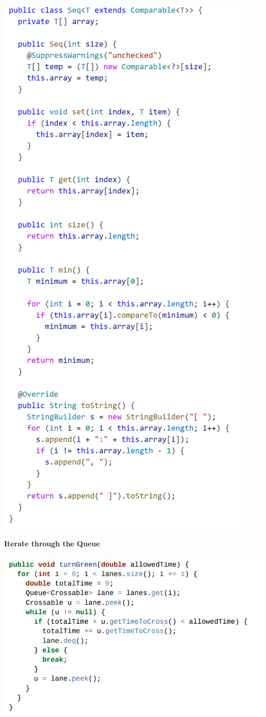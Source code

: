 \documentclass[10pt, landscape]{article}
\begin{document}
\begin{multicols}{3}
    \centerline{\includegraphics[width=0.75\linewidth]{PE/PE1/images/PE1-2.png}}
    \textbf{Iterate through the Queue}
    \centerline{\includegraphics[width=1\linewidth]{PE/PE1/images/PE1-5.png}}

\end{multicols}
\end{document}
